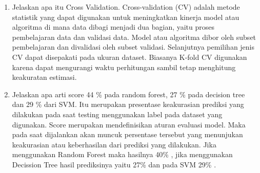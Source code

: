 \begin{enumerate}
\item Jelaskan apa itu Cross Validation.
Cross-validation (CV) adalah metode statistik yang dapat digunakan untuk meningkatkan kinerja model atau algoritma di mana data dibagi menjadi dua bagian, yaitu proses pembelajaran data dan validasi data. Model atau algoritma dibor oleh subset pembelajaran dan divalidasi oleh subset validasi. Selanjutnya pemilihan jenis CV dapat disepakati pada ukuran dataset. Biasanya K-fold CV digunakan karena dapat mengurangi waktu perhitungan sambil tetap menghitung keakuratan estimasi.

\item Jelaskan apa arti score 44 \% pada random forest, 27 \% pada decision tree dan 29 \% dari SVM.
Itu merupakan presentase keakurasian prediksi yang dilakukan pada saat testing menggunakan label pada dataset yang digunakan. Score merupakan mendefinisikan aturan evaluasi model. Maka pada saat dijalankan akan muncuk persentase tersebut yang menunjukan keakurasian atau keberhasilan dari prediksi yang dilakukan. Jika menggunakan Random Forest maka hasilnya 40\% , jika menggunakan Decission Tree hasil prediksinya yaitu 27\% dan pada SVM 29\% .


\end{enumerate}
